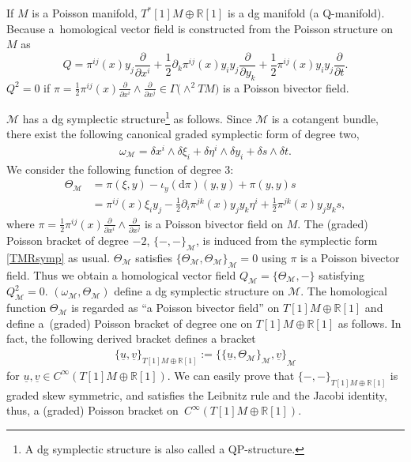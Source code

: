 \documentclass[10pt,a4paper]{amsart}
\numberwithin{equation}{section}
\def\bR{{\mathbb{R}}}
\newcommand{\calM}{{\mathcal M}}
\newcommand{\sbv}[2]{{\{{{#1},{#2}}\}}}
\newcommand{\omegam}{{\omega_{\calM}}}
\newcommand{\Thetam}{{\Theta_{\calM}}}
\newcommand{\rd}{\mathrm{d}}
\newcommand{\uu}{{\underline{u}}{}}
\newcommand{\uv}{{\underline{v}}{}}
\begin{document}
If $M$ is a Poisson manifold, $T^*[1]M \oplus \bR[1]$ is a dg manifold
(a Q-manifold).
Because a~homological vector field is constructed
from the Poisson structure on $M$ as
\[%
Q =\pi^{ij}(x) y_j \frac{\partial}{\partial x^i}
+ \frac{1}{2} \partial_k \pi^{ij}(x) y_i y_j \frac{\partial}{\partial y_k}
+ \frac{1}{2} \pi^{ij}(x) y_i y_j \frac{\partial}{\partial t}.
\]
$Q^2=0$ if $\pi = \frac{1}{2} \pi^{ij}(x) \tfrac{\partial}{\partial x^i}
\wedge \tfrac{\partial}{\partial x^j} \in \Gamma\bigl(\wedge^2 TM\bigr)$
is a Poisson bivector field.

$\calM$ has a dg symplectic structure\footnote{A dg symplectic structure is also called a QP-structure.} as follows.
Since $\calM$ is a cotangent bundle, there exist the following canonical
graded symplectic form of degree two,
\begin{gather}
\omegam = \delta x^i \wedge \delta \xi_i +
\delta \eta^i \wedge \delta y_i + \delta s \wedge \delta t.
\label{TMRsymp}
\end{gather}
We consider the following function of degree $3$:
\begin{align}
\Thetam &=
\pi(\xi, y) - \iota_y (\rd \pi)(y, y) + \pi(y, y)s
\nonumber \\
&=
\pi^{ij}(x) \xi_i y_j - \frac{1}{2} \partial_i \pi^{jk}(x) y_j y_k \eta^i
+ \frac{1}{2} \pi^{jk}(x) y_j y_k s,
\label{homologicalM}
\end{align}
where
$\pi = \frac{1}{2} \pi^{ij}(x) \tfrac{\partial}{\partial x^i}
\wedge \tfrac{\partial}{\partial x^j}$
is a Poisson bivector field on $M$.
The (graded) Poisson bracket of degree $-2$,
$\sbv{-}{-}_{\calM}$, is induced from the symplectic form
\eqref{TMRsymp} as usual.
$\Thetam$ satisfies $\sbv{\Thetam}{\Thetam}_{\calM}=0$ using
$\pi$ is a Poisson bivector field.
Thus we obtain a homological vector field
$Q_{\calM} = \sbv{\Thetam}{-}$ satisfying $Q_{\calM}^2=0$.
$(\omegam, \Thetam)$ define a dg symplectic structure
on $\calM$.
The homological function $\Thetam$ is regarded as
``a Poisson bivector field'' on $T[1]M \oplus \bR[1]$
and define a~(graded) Poisson bracket of degree one
on $T[1]M \oplus \bR[1]$ as follows.
In fact, the following derived bracket defines a bracket
\begin{gather}
\sbv{\uu}{\uv}_{T[1]M \oplus \bR[1]} :=
\sbv{\sbv{\uu}{\Thetam}_{\calM}}{\uv}_{\calM}
\label{gradedPoisson01}
\end{gather}
for $\uu, \uv \in C^{\infty}(T[1]M \oplus \bR[1])$.
We can easily prove that
$\sbv{-}{-}_{T[1]M \oplus \bR[1]}$ is graded skew symmetric,
and satisfies the Leibnitz rule and the Jacobi identity, thus, a (graded) Poisson bracket on~$C^{\infty}(T[1]M \oplus \bR[1])$.
\end{document}
